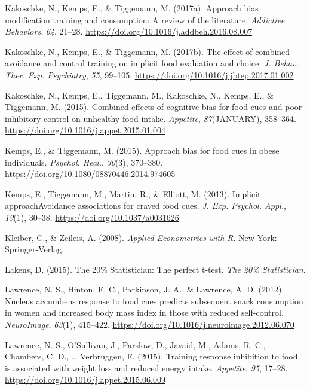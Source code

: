 \documentclass[man,floatsintext]{apa6}
\begin{document}
\leavevmode\hypertarget{ref-kakoschke_approach_2017}{}%
Kakoschke, N., Kemps, E., \& Tiggemann, M. (2017a). Approach bias modification training and consumption: A review of the literature. \emph{Addictive Behaviors}, \emph{64}, 21--28. \url{https://doi.org/10.1016/j.addbeh.2016.08.007}

\leavevmode\hypertarget{ref-kakoschke_effect_2017}{}%
Kakoschke, N., Kemps, E., \& Tiggemann, M. (2017b). The effect of combined avoidance and control training on implicit food evaluation and choice. \emph{J. Behav. Ther. Exp. Psychiatry}, \emph{55}, 99--105. \url{https://doi.org/10.1016/j.jbtep.2017.01.002}

\leavevmode\hypertarget{ref-kakoschke_combined_2015}{}%
Kakoschke, N., Kemps, E., Tiggemann, M., Kakoschke, N., Kemps, E., \& Tiggemann, M. (2015). Combined effects of cognitive bias for food cues and poor inhibitory control on unhealthy food intake. \emph{Appetite}, \emph{87}(JANUARY), 358--364. \url{https://doi.org/10.1016/j.appet.2015.01.004}

\leavevmode\hypertarget{ref-kemps_approach_2015}{}%
Kemps, E., \& Tiggemann, M. (2015). Approach bias for food cues in obese individuals. \emph{Psychol. Heal.}, \emph{30}(3), 370--380. \url{https://doi.org/10.1080/08870446.2014.974605}

\leavevmode\hypertarget{ref-kemps_implicit_2013}{}%
Kemps, E., Tiggemann, M., Martin, R., \& Elliott, M. (2013). Implicit approachAvoidance associations for craved food cues. \emph{J. Exp. Psychol. Appl.}, \emph{19}(1), 30--38. \url{https://doi.org/10.1037/a0031626}

\leavevmode\hypertarget{ref-kleiber_applied_2008}{}%
Kleiber, C., \& Zeileis, A. (2008). \emph{Applied Econometrics with R}. New York: Springer-Verlag.

\leavevmode\hypertarget{ref-lakens_20_2015}{}%
Lakens, D. (2015). The 20\% Statistician: The perfect t-test. \emph{The 20\% Statistician}.

\leavevmode\hypertarget{ref-lawrence_nucleus_2012-1}{}%
Lawrence, N. S., Hinton, E. C., Parkinson, J. A., \& Lawrence, A. D. (2012). Nucleus accumbens response to food cues predicts subsequent snack consumption in women and increased body mass index in those with reduced self-control. \emph{NeuroImage}, \emph{63}(1), 415--422. \url{https://doi.org/10.1016/j.neuroimage.2012.06.070}

\leavevmode\hypertarget{ref-lawrence_training_2015}{}%
Lawrence, N. S., O'Sullivan, J., Parslow, D., Javaid, M., Adams, R. C., Chambers, C. D., \ldots{} Verbruggen, F. (2015). Training response inhibition to food is associated with weight loss and reduced energy intake. \emph{Appetite}, \emph{95}, 17--28. \url{https://doi.org/10.1016/j.appet.2015.06.009}
\end{document}

